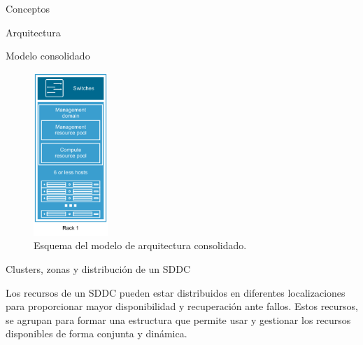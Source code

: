 \begin{section}{Conceptos}
\begin{subsection}{Arquitectura}
\begin{subsubsection}{Modelo consolidado}

\begin{figure}[h!]
  \centering
  \includegraphics[width=0.25\textwidth]{imaxes/conceptosPrevios/modelConsolidated.png}
  \caption{Esquema del modelo de arquitectura consolidado.}
  \label{fig:modeloconsolidated}
\end{figure}

\FloatBarrier

\end{subsubsection}
\end{subsection}

\begin{subsection}{Clusters, zonas y distribución de un SDDC}

  Los recursos de un SDDC pueden estar distribuidos en diferentes localizaciones para proporcionar mayor disponibilidad y recuperación ante fallos. Estos recursos, se agrupan para formar una estructura que permite usar y gestionar los recursos disponibles de forma conjunta y dinámica.


\end{subsection}
\end{section}
